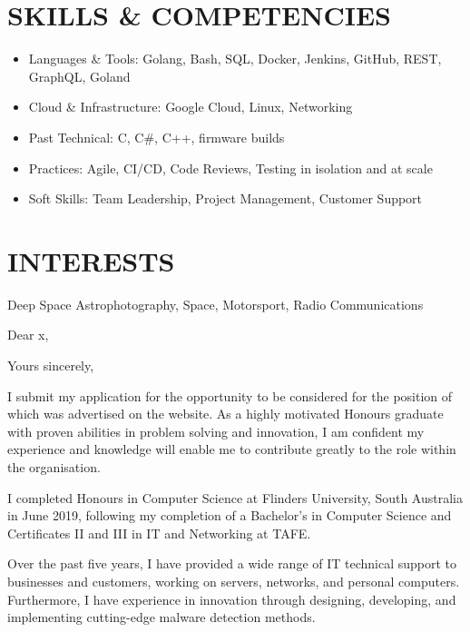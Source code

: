 \documentclass[11pt,a4paper]{moderncv}
\begin{document}
\section{SKILLS \& COMPETENCIES}
\begin{minipage}{\maincolumnwidth}%
\small{
\begin{itemize}
  \item Languages \& Tools: Golang, Bash, SQL, Docker, Jenkins, GitHub, REST, GraphQL, Goland
  \item Cloud \& Infrastructure: Google Cloud, Linux, Networking
   \item Past Technical: C, C\#, C++, firmware builds
  \item Practices: Agile, CI/CD, Code Reviews, Testing in isolation and at scale
  \item Soft Skills: Team Leadership, Project Management, Customer Support 
\end{itemize}}%
\end{minipage}%

\section{INTERESTS}
\begin{minipage}{\maincolumnwidth}%
\small{Deep Space Astrophotography, Space, Motorsport, Radio Communications}%
\end{minipage}%


\clearpage

\date{7th March 2025}
\opening{Dear x,}
\closing{Yours sincerely,}
\makelettertitle

I submit my application for the opportunity to be considered for the position of \jListing{} which was advertised on the\cName{} website. As a highly motivated Honours graduate with proven abilities in problem solving and innovation, I am confident my experience and knowledge will enable me to contribute greatly to the role within the organisation.

I completed Honours in Computer Science at Flinders University, South Australia in June 2019, following my completion of a Bachelor's in Computer Science and Certificates II and III in IT and Networking at TAFE.

Over the past five years, I have provided a wide range of IT technical support to businesses and customers, working on servers, networks, and personal computers. Furthermore, I have experience in innovation through designing, developing, and implementing cutting-edge malware detection methods.
\end{document}
